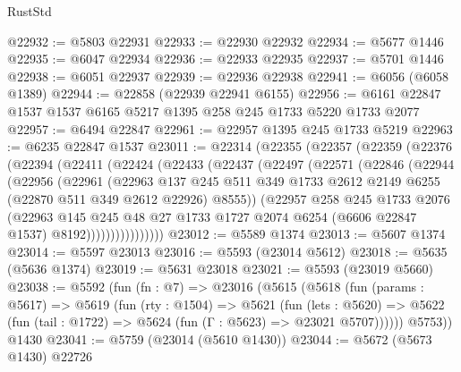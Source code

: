\begin{lexlean}{RustStd}
\begin{coremodule}
@22932 := @5803 @22931
@22933 := @22930 @22932
@22934 := @5677 @1446
@22935 := @6047 @22934
@22936 := @22933 @22935
@22937 := @5701 @1446
@22938 := @6051 @22937
@22939 := @22936 @22938
@22941 := @6056 (@6058 @1389)
@22944 := @22858 (@22939 @22941 @6155)
@22956 := @6161 @22847 @1537 @1537 @6165 @5217 @1395 @258 @245 @1733 @5220 @1733 @2077
@22957 := @6494 @22847
@22961 := @22957 @1395 @245 @1733 @5219
@22963 := @6235 @22847 @1537
@23011 := @22314
    (@22355
      (@22357
        (@22359
          (@22376
            (@22394
              (@22411
                (@22424
                  (@22433
                    (@22437
                      (@22497
                        (@22571
                          (@22846
                            (@22944
                              (@22956
                                (@22961
                                  (@22963
                                    @137
                                    @245
                                    @511
                                    @349
                                    @1733
                                    @2612
                                    @2149
                                    @6255
                                    (@22870 @511 @349 @2612 @22926)
                                    @8555))
                                (@22957
                                  @258
                                  @245
                                  @1733
                                  @2076
                                  (@22963
                                    @145
                                    @245
                                    @48
                                    @27
                                    @1733
                                    @1727
                                    @2074
                                    @6254
                                    (@6606 @22847 @1537)
                                    @8192))))))))))))))))
@23012 := @5589 @1374
@23013 := @5607 @1374
@23014 := @5597 @23013
@23016 := @5593 (@23014 @5612)
@23018 := @5635 (@5636 @1374)
@23019 := @5631 @23018
@23021 := @5593 (@23019 @5660)
@23038 := @5592
    (fun (fn : @7) =>
    @23016
      (@5615
        (@5618
          (fun (params : @5617) =>
          @5619
            (fun (rty : @1504) =>
            @5621
              (fun (lets : @5620) =>
              @5622 (fun (tail : @1722) => @5624 (fun (Γ : @5623) => @23021 @5707))))))
        @5753))
    @1430
@23041 := @5759 (@23014 (@5610 @1430))
@23044 := @5672 (@5673 @1430) @22726

\end{coremodule}
\end{lexlean}
